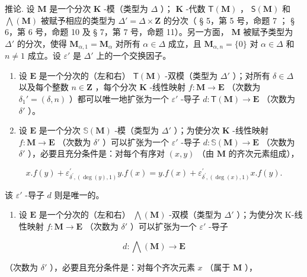 推论. 设 \(\mathbf{M}\) 是一个分次 \(\mathbf{K}\) -模（类型为 \(\Delta\) ）； \(\mathbf{K}\) -代数 \(\mathsf{T}(\mathbf{M})\) ， \(\mathsf{S}(\mathbf{M})\) 和 \(\bigwedge (\mathbf{M})\) 被赋予相应的类型为 \(\Delta' = \Delta \times \mathbf{Z}\) 的分次（ § 5，第 5 号，命题 7 ； § 6，第 6 号，命题 10 及 § 7，第 7 号，命题 11）。另一方面， \(\mathbf{M}\) 被赋予类型为 \(\Delta'\) 的分次，使得 \(\mathbf{M}_{\alpha,1} = \mathbf{M}_{\alpha}\) 对所有 \(\alpha \in \Delta\) 成立，且 \(\mathbf{M}_{\alpha,n} = \{0\}\) 对 \(\alpha \in \Delta\) 和 \(n \neq 1\) 成立。设 \(\varepsilon'\) 是 \(\Delta'\) 上的一个交换因子。

\begin{enumerate}
\def\labelenumi{(\roman{enumi})}
\item
  设 \(\mathbf{E}\) 是一个分次的（左和右） \(\mathsf{T}(\mathbf{M})\) -双模（类型为 \(\Delta'\) ）；对所有 \(\delta \in \Delta\) 以及每个整数 \(n \in \mathbf{Z}\) ，每个分次 \(\mathbf{K}\) -线性映射 \(f: \mathbf{M} \to \mathbf{E}\) （次数为 \(\delta_1' = (\delta, n)\) ）都可以唯一地扩张为一个 \(\varepsilon'\) -导子 \(d: \mathsf{T}(\mathbf{M}) \to \mathbf{E}\) （次数为 \(\delta'\) ）。
\item
  设 \(\mathbf{E}\) 是一个分次 \(\mathbb{S}(\mathbf{M})\) -模（类型为 \(\Delta'\) ）；为使分次 \(\mathbf{K}\) -线性映射 \(f: \mathbf{M} \to \mathbf{E}\) （次数为 \(\delta'\) ）可以扩张为一个 \(\varepsilon'\) -导子 \(d: \mathbb{S}(\mathbf{M}) \to \mathbf{E}\) （次数为 \(\delta'\) ），必要且充分条件是：对每个有序对 \((x, y)\) （由 \(\mathbf{M}\) 的齐次元素组成），
\end{enumerate}

\[
x. f (y) + \varepsilon_ {\delta^ {\prime}, (\deg (y), 1)} ^ {\prime} y. f (x) = y. f (x) + \varepsilon_ {\delta^ {\prime}, (\deg (x), 1)} ^ {\prime} x. f (y).\tag{33}
\]

该 \(\varepsilon'\) -导子 \(d\) 则是唯一的。

\begin{enumerate}
\def\labelenumi{(\roman{enumi})}
\setcounter{enumi}{2}
\tightlist
\item
  设 \(\mathbf{E}\) 是一个分次的（左和右） \(\bigwedge (\mathbf{M})\) -双模（类型为 \(\Delta'\) ）；为使分次 K-线性映射 \(f: \mathbf{M} \to \mathbf{E}\) （次数为 \(\delta'\) ）可以扩张为一个 \(\varepsilon'\) -导子
\end{enumerate}

\[
d: \bigwedge (\mathbf {M}) \rightarrow \mathbf {E}
\]

（次数为 \(\delta'\) ），必要且充分条件是：对每个齐次元素 \(x\) （属于 \(\mathbf{M}\) ），

